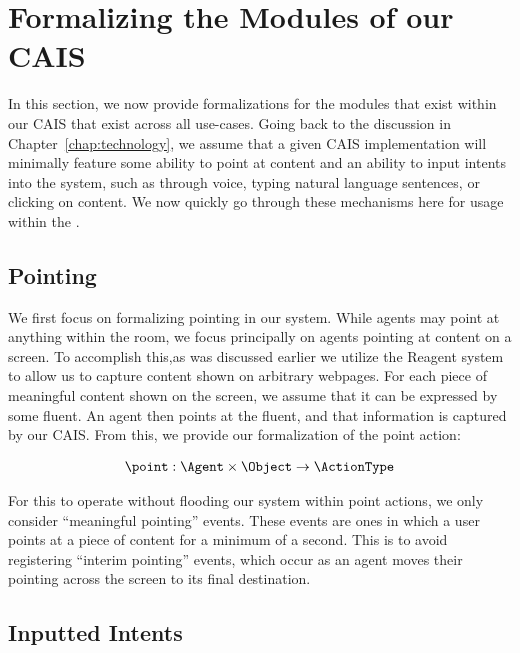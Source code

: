 \section{Formalizing the Modules of our CAIS}

In this section, we now provide formalizations for the modules that exist within our
CAIS that exist across all use-cases. Going back to the discussion in 
Chapter~\ref{chap:technology}, we assume that a given CAIS implementation will minimally
feature some ability to point at content and an ability to input intents into the system,
such as through voice, typing natural language sentences, or clicking on content. We now
quickly go through these mechanisms here for usage within the \CEC.

\subsection{Pointing}

We first focus on formalizing pointing in our system. While agents may point at anything 
within the room, we focus principally on agents pointing at content on a screen. To 
accomplish this,as was discussed earlier we utilize the Reagent system to allow us to
capture content  shown on arbitrary webpages. For each piece of meaningful content shown on 
the screen, we  assume that it can be expressed by some fluent. An agent then points at the 
fluent, and that information is captured by our CAIS. From this, we provide our
formalization of the point action:

\begin{equation*}
\begin{aligned}
  \point: \Agent \times \Object \rightarrow \ActionType
\end{aligned}
\end{equation*}

For this to operate without flooding our system within point actions, we only consider
``meaningful pointing'' events. These events are ones in which a user points at a piece
of content for a minimum of a second. This is to avoid registering ``interim pointing''
events, which occur as an agent moves their pointing across the screen to its final
destination.

\subsection{Inputted Intents}

